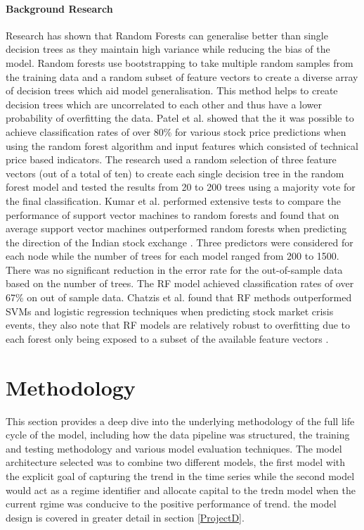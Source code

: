 \documentclass[11pt]{article}
\begin{document}
\paragraph{Background Research}
Research has shown that Random Forests can generalise better than single decision trees as they maintain high variance while reducing the bias of the model\cite{Genuer2012}.
 Random forests use bootstrapping to take multiple random samples from the training data and a random subset of feature vectors to create a diverse array of decision trees which aid model generalisation. This method helps to create decision trees which are uncorrelated to each other and thus have a lower probability of overfitting the data. Patel et al. showed that the it was possible to achieve classification rates of over 80\% for various stock price predictions when using the random forest algorithm and input features which consisted of technical price based indicators\cite{Patel2015}. The research used a random selection of three feature vectors (out of a total of ten) to create each single decision tree in the random forest model and tested the results from 20 to 200 trees using a majority vote for the final classification.  \newline
Kumar et al. performed extensive tests to compare the performance of support vector machines to random forests and found that on average support vector machines outperformed random forests when predicting the direction of the Indian stock exchange \cite{Kumar2006}. Three predictors were considered for each node while the number of trees for each model ranged from 200 to 1500. There was no significant reduction in the error rate for the out-of-sample data based on the number of trees. The RF model achieved classification rates of over 67\% on out of sample data.\newline
Chatzis et al. found that RF methods outperformed SVMs and logistic regression techniques when predicting stock market crisis events, they also note that RF models are relatively robust to overfitting due to each forest only being exposed to a subset of the available feature vectors \cite{Chatzis2018}.
 
\clearpage

\section{Methodology} \label{method}

This section provides a deep dive into the underlying methodology of the full life cycle of the model, including how the data pipeline was structured,  the training and testing methodology and various model evaluation techniques. The model architecture selected was to combine two different models, the first model with the explicit goal of capturing the trend in the time series while the second model would act as a regime identifier and allocate capital to the tredn model when the current rgime was conducive to the positive performance of trend. the model design is covered in greater detail in section \ref{ProjectD}.
\end{document}

